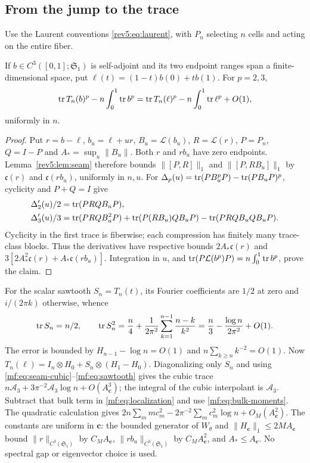 \subsection{From the jump to the trace}
Use the Laurent conventions \eqref{rev5:eq:laurent}, with $P_n$ selecting
$n$ cells and acting on the entire fiber.
\begin{lemma}\label{mf:lem:localization}
If $b\in C^3([0,1];\mathfrak S_1)$ is self-adjoint and its two endpoint
ranges span a finite-dimensional space, put $\ell(t)=(1-t)b(0)+tb(1)$.
For $p=2,3$,
\begin{equation}\label{mf:eq:localization}
 \operatorname{tr} T_n(b)^p-n\int_0^1\operatorname{tr} b^p
 =\operatorname{tr} T_n(\ell)^p-n\int_0^1\operatorname{tr}\ell^p+O(1),
\end{equation}
uniformly in $n$.
\end{lemma}
\begin{proof}
Put $r=b-\ell$, $b_u=\ell+ur$, $B_u=\mathcal L(b_u)$,
$R=\mathcal L(r)$, $P=P_n$, $Q=I-P$ and $A_* =\sup_u\|B_u\|$.
Both $r$ and $rb_u$ have zero endpoints. Lemma~\ref{rev5:lem:seam}
therefore bounds $\|[P,R]\|_1$ and $\|[P,RB_u]\|_1$ by
$\mathfrak c(r)$ and $\mathfrak c(rb_u)$, uniformly in $n,u$.
For $\Delta_p(u)=\operatorname{tr}(PB_u^pP)-\operatorname{tr}(PB_uP)^p$, cyclicity and $P+Q=I$ give
\begin{align*}
 \Delta_2'(u)/2&=\operatorname{tr}(PRQB_uP),\\
 \Delta_3'(u)/3&=\operatorname{tr}(PRQB_u^2P)+\operatorname{tr}(P(RB_u)QB_uP)
                   -\operatorname{tr}(PRQB_uQB_uP).
\end{align*}
Cyclicity in the first trace is fiberwise; each compression has finitely
many trace-class blocks. Thus the derivatives have respective bounds
$2A_*\mathfrak c(r)$ and
$3[2A_*^2\mathfrak c(r)+A_*\mathfrak c(rb_u)]$.
Integration in $u$, and
$\operatorname{tr}(P\mathcal L(b^p)P)=n\int_0^1\operatorname{tr} b^p$, prove the claim.
\end{proof}
For the scalar sawtooth $S_n=T_n(t)$, its Fourier coefficients are
$1/2$ at zero and $i/(2\pi k)$ otherwise, whence
\begin{equation}\label{mf:eq:sawtooth}
 \operatorname{tr} S_n=n/2,\qquad
 \operatorname{tr} S_n^2=\frac n4+\frac1{2\pi^2}\sum_{k=1}^{n-1}\frac{n-k}{k^2}
 =\frac n3-\frac{\log n}{2\pi^2}+O(1).
\end{equation}
The error is bounded by $H_{n-1}-\log n=O(1)$ and
$n\sum_{k\ge n}k^{-2}=O(1)$.
Now $T_n(\ell)=I_n\otimes H_0+S_n\otimes(H_1-H_0)$.
Diagonalizing only $S_n$ and using
\eqref{mf:eq:seam-cubic}--\eqref{mf:eq:sawtooth} gives the cubic trace
$n\mathcal A_3+3\pi^{-2}\mathcal A_3\log n+O(A_{\mathbf c}^3)$;
the integral of the cubic interpolant is $\mathcal A_3$.
Subtract that bulk term in \eqref{mf:eq:localization} and use
\eqref{mf:eq:bulk-moments}. The quadratic calculation gives
$2n\sum_m m c_m^2-2\pi^{-2}\sum_m c_m^2\log n+O_M(A_{\mathbf c}^2)$.
The constants are uniform in $\mathbf c$: the bounded generator of
$W_\theta$ and $\|H_{\mathbf c}\|_1\le2MA_{\mathbf c}$ bound
$\|r\|_{C^3(\mathfrak S_1)}$ by $C_MA_{\mathbf c}$,
$\|rb_u\|_{C^3(\mathfrak S_1)}$ by $C_MA_{\mathbf c}^2$, and
$A_*\le A_{\mathbf c}$. No spectral gap or eigenvector choice is used.

